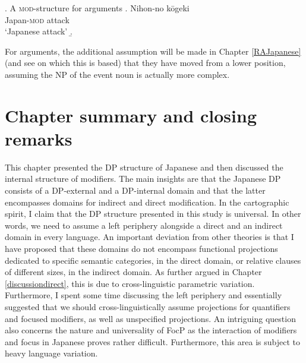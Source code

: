 \documentclass [output=book,colorlinks,citecolor=brown]{langscibook}
\begin{document}
\ex. A \textsc{mod}-structure for arguments
\ag. Nihon-no kōgeki\\
Japan-\textsc{mod} attack\\
`Japanese attack’
\b. 

For arguments, the additional assumption will be made in Chapter \ref{RAJapanese} (and see \citealt{laenzlinger:2005:french, laenzlinger:2011:elements} on which this is based) that they have moved from a lower position, assuming the NP of the event noun is actually more complex.

\newpage

\section{Chapter summary and closing remarks}

This chapter presented the DP structure of Japanese and then discussed the internal structure of modifiers. The main insights are that the Japanese DP consists of a DP-external and a DP-internal domain and that the latter encompasses domains for indirect and direct modification. In the cartographic spirit, I claim that the DP structure presented in this study is universal. In other words, we need to assume a left periphery alongside a direct and an indirect domain in every language. An important deviation from other theories \citep{cinque:2010:adj, cinque:2020:relcl, scott:2002:stacked, laenzlinger:2005:french, laenzlinger:2011:elements, kim:2019:syntax} is that I have proposed that these domains do not encompass functional projections dedicated to specific semantic categories, in the direct domain, or relative clauses of different sizes, in the indirect domain. As further argued in Chapter \ref{discussiondirect}, this is due to cross-linguistic parametric variation. Furthermore, I spent some time discussing the left periphery and essentially suggested that we should cross-linguistically assume projections for quantifiers and focused modifiers, as well as unspecified projections. An intriguing question also concerns the nature and universality of FocP as the interaction of modifiers and focus in Japanese proves rather difficult. Furthermore, this area is subject to heavy language variation.
\end{document}
